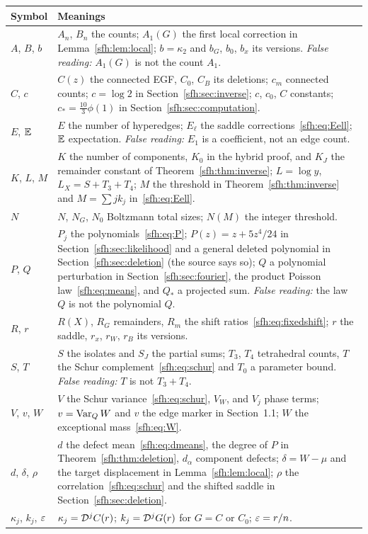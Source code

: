 \noindent\begin{longtable}{@{}>{\raggedright\arraybackslash}p{0.95in}>{\raggedright\arraybackslash}p{5.3in}@{}}
\toprule
Symbol & Meanings\\
\midrule
$A$, $B$, $b$ & $A_n$, $B_n$ the counts; $A_1(G)$ the first local correction in Lemma~\ref{sfh:lem:local}; $b=\kappa_2$ and $b_G$, $b_0$, $b_x$ its versions. \emph{False reading:} $A_1(G)$ is not the count $A_1$.\\
$C$, $c$ & $C(z)$ the connected EGF, $C_0$, $C_B$ its deletions; $c_m$ connected counts; $c=\log2$ in Section~\ref{sfh:sec:inverse}; $c$, $c_0$, $C$ constants; $c_*=\frac{10}3\phi(1)$ in Section~\ref{sfh:sec:computation}.\\
$E$, $\mathbb E$ & $E$ the number of hyperedges; $E_\ell$ the saddle corrections~\eqref{sfh:eq:Eell}; $\mathbb E$ expectation. \emph{False reading:} $E_1$ is a coefficient, not an edge count.\\
$K$, $L$, $M$ & $K$ the number of components, $K_0$ in the hybrid proof, and $K_J$ the remainder constant of Theorem~\ref{sfh:thm:inverse}; $L=\log y$, $L_X=S+T_3+T_4$; $M$ the threshold in Theorem~\ref{sfh:thm:inverse} and $M=\sum jk_j$ in~\eqref{sfh:eq:Eell}.\\
$N$ & $N$, $N_G$, $N_0$ Boltzmann total sizes; $N(M)$ the integer threshold.\\
$P$, $Q$ & $P_j$ the polynomials~\eqref{sfh:eq:P}; $P(z)=z+5z^4/24$ in Section~\ref{sfh:sec:likelihood} and a general deleted polynomial in Section~\ref{sfh:sec:deletion} (the source says so); $Q$ a polynomial perturbation in Section~\ref{sfh:sec:fourier}, the product Poisson law~\eqref{sfh:eq:means}, and $Q_*$ a projected sum. \emph{False reading:} the law $Q$ is not the polynomial $Q$.\\
$R$, $r$ & $R(X)$, $R_G$ remainders, $R_m$ the shift ratios~\eqref{sfh:eq:fixedshift}; $r$ the saddle, $r_x$, $r_W$, $r_B$ its versions.\\
$S$, $T$ & $S$ the isolates and $S_J$ the partial sums; $T_3$, $T_4$ tetrahedral counts, $T$ the Schur complement~\eqref{sfh:eq:schur} and $T_0$ a parameter bound. \emph{False reading:} $T$ is not $T_3+T_4$.\\
$V$, $v$, $W$ & $V$ the Schur variance~\eqref{sfh:eq:schur}, $V_W$, and $V_j$ phase terms; $v=\operatorname{Var}_QW$ and $v$ the edge marker in Section~1.1; $W$ the exceptional mass~\eqref{sfh:eq:W}.\\
$d$, $\delta$, $\rho$ & $d$ the defect mean~\eqref{sfh:eq:dmeans}, the degree of $P$ in Theorem~\ref{sfh:thm:deletion}, $d_\alpha$ component defects; $\delta=W-\mu$ and the target displacement in Lemma~\ref{sfh:lem:local}; $\rho$ the correlation~\eqref{sfh:eq:schur} and the shifted saddle in Section~\ref{sfh:sec:deletion}.\\
$\kappa_j$, $k_j$, $\varepsilon$ & $\kappa_j=\mathcal D^jC(r)$; $k_j=\mathcal D^jG(r)$ for $G=C$ or $C_0$; $\varepsilon=r/n$.\\
\bottomrule
\end{longtable}
